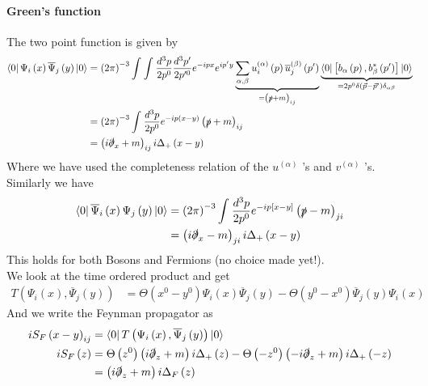 \documentclass{report}
\begin{document}
\paragraph{Green's function} The two point function is given by
\begin{align*}
  \bra{0} \Psi_i \left( x \right) \overline{\Psi}_j\left( y \right) \ket{0} &= 
  \left( 2\pi \right) ^{-3} \int_{}^{} \int_{}^{} \frac{d^3p}{2p^{0} } \frac{d^3p'}{2p'^{0} } e^{-ipx} e^{ip'y} \underbrace{\sum_{\alpha, \beta}^{} u_i^{\left( \alpha \right) } \left( p \right) \overline{u}_j^{\left( \beta \right) } \left( p' \right) }_{= \left( \slashed{p} + m \right)_{ij} }   \underbrace{ \bra{0} \left[ b_\alpha\left( p \right), b_\beta^{*} \left( p' \right) \right]  \ket{0}}_{= 2p^{0} \delta\left( \vec{p} - \vec{p}' \right) \delta_{\alpha \beta} }  \\
   &=  \left( 2\pi \right) ^{-3} \int_{}^{} \frac{d^3 p}{2p^{0} } e^{-ip \left( x-y \right) } \left( \slashed{p} + m \right)_{ij}  \\
   &= \left( i \slashed{\partial}_x + m  \right)_{ij} i \Delta_+\left( x-y \right)
\end{align*}
Where we have used the completeness relation of the $u^{\left( \alpha \right) } $ 's and $v^{\left( \alpha \right) } $ 's.\\
Similarly we have 
\begin{align*}
  \bra{0} \overline{\Psi}_i \left( x \right) \Psi_j\left( y \right) \ket{0} &= 
  \left( 2 \pi \right) ^{-3} \int_{}^{} \frac{d^3p}{2p^{0} } e^{-ip\left[ x-y \right] } \left( \slashed{p} - m \right)_{ji}  \\
  &= \left( i \slashed{\partial}_x - m  \right)_{ji} i \Delta_+\left( x-y \right) 
\end{align*}
This holds for both Bosons and Fermions (no choice made yet!).\\
We look at the time ordered product and get
\begin{align*}
  T\left( \Psi_i\left( x \right) , \overline{\Psi}_j\left( y \right)  \right) &= 
  \Theta\left( x^{0 } - y^{0}  \right) \Psi_i \left( x \right) \overline{\Psi}_j\left( y \right) - \Theta\left( y^{0} - x^{0}  \right) \overline{\Psi}_j\left( y \right) \Psi_i\left( x \right)
\end{align*}
And we write the Feynman propagator as
\begin{align*}
  i S_F\left( x-y \right)_{ij}  &= \bra{0} T\left( \Psi_i\left( x \right) , \overline{\Psi}_j \left( y \right)  \right) \ket{0}  \\
  i S_F\left( z \right) &= \Theta\left( z^{0}  \right) \left( i \slashed{\partial}_z + m  \right) i \Delta_+\left( z \right) - \Theta\left( -z^{0}  \right) \left( -i \slashed{\partial}_z + m  \right) i \Delta_+\left( -z \right)  \\
  &= \left( i \slashed{\partial}_z + m  \right) i \Delta_F \left( z \right) 
\end{align*}
\end{document}
